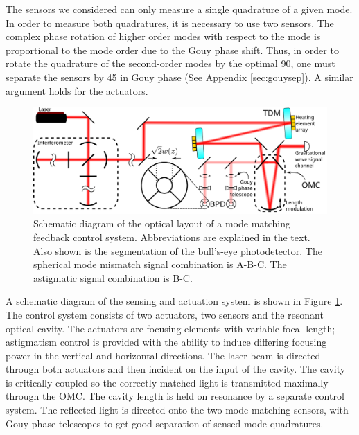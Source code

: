 The sensors we considered can only measure a single quadrature of a given mode. %
In order to measure both quadratures, it is necessary to use two sensors. %
The complex phase rotation of higher order modes with respect to the  mode is proportional to the mode order due to the Gouy phase shift. %
Thus, in order to rotate the quadrature of the second-order modes by the optimal 90\degrees{}, one must separate the sensors by 45\degrees{} in Gouy phase (See Appendix \ref{sec:gouysep}). %
A similar argument holds for the actuators.

\begin{figure}
  \begin{center}
  \leavevmode
  \includegraphics[width=\textwidth]{figs-modematching/blockdiag}
  \end{center}
  \caption[Schematic diagram of the optical layout of a mode matching feedback control system.]{Schematic diagram of the optical layout of a mode matching feedback control system. Abbreviations are explained in the text. Also shown is the segmentation of the bull's-eye photodetector. The spherical mode mismatch signal combination is A-B-C. The astigmatic signal combination is B-C.}
  \label{fig:mmblockdiag}
\end{figure}
A schematic diagram of the sensing and actuation system is shown in Figure \ref{fig:mmblockdiag}. %
The control system consists of two actuators, two sensors and the resonant optical cavity. %
The actuators are focusing elements with variable focal length; astigmatism control is provided with the ability to induce differing focusing power in the vertical and horizontal directions. %
The laser beam is directed through both actuators and then incident on the input of the cavity. %
The cavity is critically coupled so the correctly matched light is transmitted maximally through the OMC. %
The cavity length is held on resonance by a separate control system. %
The reflected light is directed onto the two mode matching sensors, with Gouy phase telescopes to get good separation of sensed mode quadratures.

